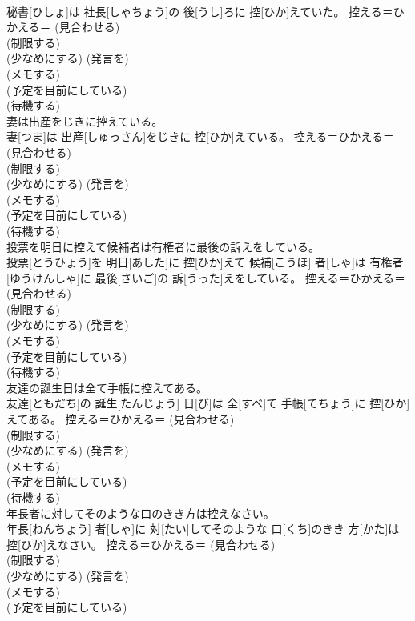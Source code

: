 \documentclass[8pt]{extreport}
\begin{document}
\begin{CJK}{UTF8}{min}
{\\	秘書[ひしょ]は 社長[しゃちょう]の 後[うし]ろに 控[ひか]えていた。	控える＝ひかえる＝ (見合わせる) 
\\	(制限する) 
\\	(少なめにする) (発言を) 
\\	(メモする) 
\\	(予定を目前にしている) 
\\	(待機する) 
\\	妻は出産をじきに控えている。	
\\	妻[つま]は 出産[しゅっさん]をじきに 控[ひか]えている。	控える＝ひかえる＝ (見合わせる) 
\\	(制限する) 
\\	(少なめにする) (発言を) 
\\	(メモする) 
\\	(予定を目前にしている) 
\\	(待機する) 
\\	投票を明日に控えて候補者は有権者に最後の訴えをしている。	
\\	投票[とうひょう]を 明日[あした]に 控[ひか]えて 候補[こうほ] 者[しゃ]は 有権者[ゆうけんしゃ]に 最後[さいご]の 訴[うった]えをしている。	控える＝ひかえる＝ (見合わせる) 
\\	(制限する) 
\\	(少なめにする) (発言を) 
\\	(メモする) 
\\	(予定を目前にしている) 
\\	(待機する) 
\\	友達の誕生日は全て手帳に控えてある。	
\\	友達[ともだち]の 誕生[たんじょう] 日[び]は 全[すべ]て 手帳[てちょう]に 控[ひか]えてある。	控える＝ひかえる＝ (見合わせる) 
\\	(制限する) 
\\	(少なめにする) (発言を) 
\\	(メモする) 
\\	(予定を目前にしている) 
\\	(待機する) 
\\	年長者に対してそのような口のきき方は控えなさい。	
\\	年長[ねんちょう] 者[しゃ]に 対[たい]してそのような 口[くち]のきき 方[かた]は 控[ひか]えなさい。	控える＝ひかえる＝ (見合わせる) 
\\	(制限する) 
\\	(少なめにする) (発言を) 
\\	(メモする) 
\\	(予定を目前にしている) 
}
\end{CJK}
\end{document}
